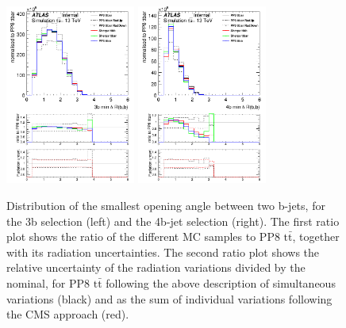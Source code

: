 \begin{figure}[!htb]
\centering
\includegraphics[width=0.38\textwidth]{Plots/ttbb/hisgenEvt_Dr_MinDeltaRGenBJets_4j3t__div}
\includegraphics[width=0.38\textwidth]{Plots/ttbb/hisgenEvt_Dr_MinDeltaRGenBJets_4j4t__div}
  \caption{Distribution of the smallest opening angle between two b-jets, for the 3b selection (left) and the 4b-jet selection (right). The first ratio plot shows the ratio of the different MC samples to PP8 $\mathrm{t\bar{t}}$, together with its radiation uncertainties. The second ratio plot shows the relative uncertainty of the radiation variations divided by the nominal, for PP8 $\mathrm{t\bar{t}}$ following the above description of simultaneous variations (black) and as the sum of individual variations following the CMS approach (red). \label{ttbb:mindR}}
\end{figure}

